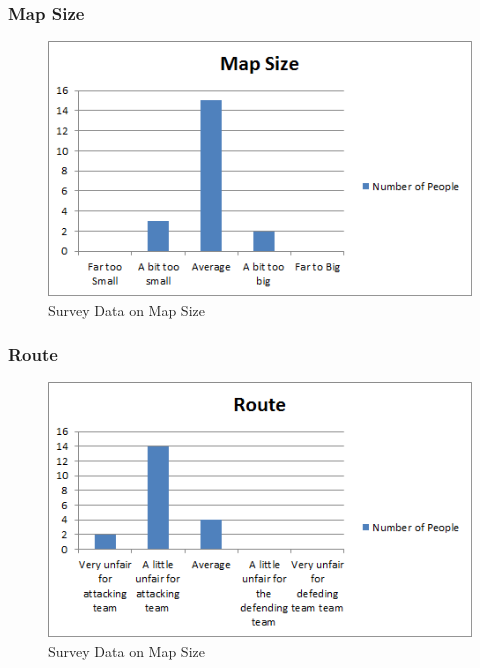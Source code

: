 \documentclass[12pt,a4paper,oneside]{book}
\begin{document}
\subsubsection{Map Size}
\begin{figure}[h]
	\includegraphics[width=1.0\textwidth]{images/Size3.png}
	\caption{Survey Data on Map Size}
\end{figure}
\subsubsection{Route}
\begin{figure}[h]
	\includegraphics[width=1.0\textwidth]{images/Route3.png}
	\caption{Survey Data on Map Size}
\end{figure}
\end{document}
